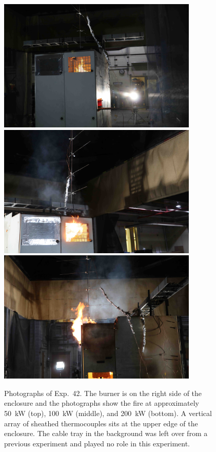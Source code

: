 \begin{figure}[p]
\centering
\includegraphics[height=2.50in]{../FIGURES/Test_42_start} \\ \vspace{0.1in}
\includegraphics[height=2.50in]{../FIGURES/Test_42_rear} \\ \vspace{0.1in}
\includegraphics[height=2.50in]{../FIGURES/Test_42_side}
\caption[Photographs of Exp.~42]{Photographs of Exp.~42. The burner is on the right side of the enclosure and the photographs show the fire at approximately 50~kW (top), 100~kW (middle), and 200~kW (bottom). A vertical array of sheathed thermocouples sits at the upper edge of the enclosure. The cable tray in the background was left over from a previous experiment and played no role in this experiment. }
\label{fig:Test_42_photos}
\end{figure}


